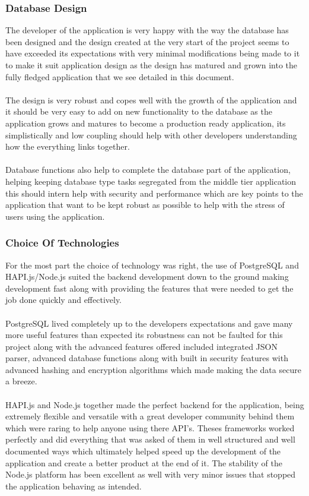 \subsubsection{Database Design}

The developer of the application is very happy with the way the database has been designed and the design created at the very start of the project seems to have exceeded its expectations with very minimal modifications being made to it to make it suit application design as the design has matured and grown into the fully fledged application that we see detailed in this document.\\
\\
The design is very robust and copes well with the growth of the application and it should be very easy to add on new functionality to the database as the application grows and matures to become a production ready application, its simplistically and low coupling should help with other developers understanding how the everything links together.\\
\\
Database functions also help to complete the database part of the application, helping keeping database type tasks segregated from the middle tier application this should intern help with security and performance which are key points to the application that want to be kept robust as possible to help with the stress of users using the application.

\subsubsection{Choice Of Technologies}

For the most part the choice of technology was right, the use of PostgreSQL and HAPI.js/Node.js suited the backend development down to the ground making development fast along with providing the features that were needed to get the job done quickly and effectively.\\
\\
PostgreSQL lived completely up to the developers expectations and gave many more useful features than expected its robustness can not be faulted for this project along with the advanced features offered included integrated JSON parser, advanced database functions along with built in security features with advanced hashing and encryption algorithms which made making the data secure a breeze.\\
\\
HAPI.js and Node.js together made the perfect backend for the application, being extremely flexible and versatile with a great developer community behind them which were raring to help anyone using there API's. Theses frameworks worked perfectly and did everything that was asked of them in well structured and well documented ways which ultimately helped speed up the development of the application and create a better product at the end of it. The stability of the Node.js platform has been excellent as well with very minor issues that stopped the application behaving as intended.

